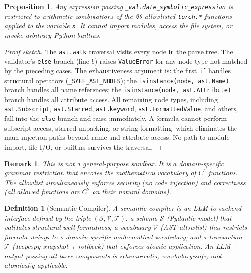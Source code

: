 \documentclass[11pt,a4paper]{article}
\newtheorem{definition}{Definition}
\newtheorem{proposition}{Proposition}
\newtheorem{remark}{Remark}
\begin{document}
\begin{proposition}
Any expression passing \texttt{\_validate\_symbolic\_expression} is restricted to
arithmetic combinations of the 20 allowlisted \texttt{torch.*} functions applied to
the variable \texttt{x}. It cannot import modules, access the file system, or invoke
arbitrary Python builtins.
\end{proposition}
\begin{proof}[Proof sketch]
The \texttt{ast.walk} traversal visits every node in the parse tree. The validator's
\texttt{else} branch (line 9) raises \texttt{ValueError} for any node type not matched
by the preceding cases. The exhaustiveness argument is: the first \texttt{if} handles
structural operators (\texttt{\_SAFE\_AST\_NODES}); the
\texttt{isinstance(node, ast.Name)} branch handles all name references; the
\texttt{isinstance(node, ast.Attribute)} branch handles all attribute access. All
remaining node types, including \texttt{ast.Subscript}, \texttt{ast.Starred},
\texttt{ast.keyword}, \texttt{ast.FormattedValue}, and others, fall into the
\texttt{else} branch and raise immediately. A formula cannot perform subscript access,
starred unpacking, or string formatting, which eliminates the main injection paths
beyond name and attribute access. No path to module import, file I/O, or builtins
survives the traversal.
\end{proof}

\begin{remark}
This is not a general-purpose sandbox. It is a domain-specific grammar restriction
that encodes the mathematical vocabulary of $C^2$ functions. The allowlist
simultaneously enforces security (no code injection) and correctness (all allowed
functions are $C^2$ on their natural domains).
\end{remark}

\begin{definition}[Semantic Compiler]
A \emph{semantic compiler} is an LLM-to-backend interface defined by the triple
$(\mathcal{S}, \mathcal{V}, \mathcal{T})$: a \emph{schema} $\mathcal{S}$ (Pydantic
model) that validates structural well-formedness; a \emph{vocabulary} $\mathcal{V}$
(AST allowlist) that restricts formula strings to a domain-specific mathematical
vocabulary; and a \emph{transaction} $\mathcal{T}$ (deepcopy snapshot + rollback)
that enforces atomic application. An LLM output passing all three components is
\emph{schema-valid}, \emph{vocabulary-safe}, and \emph{atomically applicable}.
\end{definition}
\end{document}
